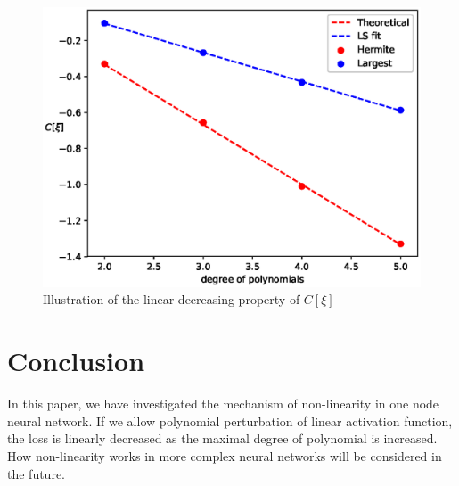 \documentclass[conference]{IEEEtran}
\begin{document}
\begin{figure}
    \includegraphics[width=\linewidth]{fixed_nk.eps}
    \caption{Illustration of the linear decreasing property of $C[\xi]$}\label{fig:fixednk}
\end{figure}


\section{Conclusion}\label{sec:con}

In this paper, we have investigated the mechanism of non-linearity in one node neural network. If we allow polynomial perturbation of linear activation function, the loss is linearly decreased as the maximal degree of polynomial is increased. How non-linearity works in more complex neural networks will be considered in the future. 
\end{document}
